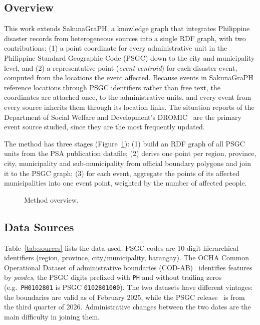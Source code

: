\documentclass[acmtog]{acmart}
\begin{document}

\subsection{Overview}

This work extends SakunaGraPH, a knowledge graph that integrates Philippine disaster records
from heterogeneous sources into a single RDF graph, with two contributions: (1) a point
coordinate for every administrative unit in the Philippine Standard Geographic Code (PSGC)
down to the city and municipality level, and (2) a representative point (\emph{event
centroid}) for each disaster event, computed from the locations the event affected. Because
events in SakunaGraPH reference locations through PSGC identifiers rather than free text, the
coordinates are attached once, to the administrative units, and every event from every source
inherits them through its location links. The situation reports of the Department of Social
Welfare and Development's DROMIC~\cite{dswd2026dromic} are the primary event source studied,
since they are the most frequently updated.

The method has three stages (Figure~\ref{fig:overview}): (1) build an RDF graph of all PSGC
units from the PSA publication datafile; (2) derive one point per region, province, city,
municipality and sub-municipality from official boundary polygons and join it to the PSGC
graph; (3) for each event, aggregate the points of its affected municipalities into one event
point, weighted by the number of affected people.

\begin{figure}[t]
  \centering
  \caption{Method overview.}
  \label{fig:overview}
\end{figure}

\subsection{Data Sources}

Table~\ref{tab:sources} lists the data used. PSGC codes are 10-digit hierarchical identifiers
(region, province, city/municipality, barangay). The OCHA Common Operational Dataset of
administrative boundaries (COD-AB)~\cite{ocha2025codab} identifies features by \emph{pcodes},
the PSGC digits prefixed with \texttt{PH} and without trailing zeros (e.g.\ \texttt{PH0102801}
is PSGC \texttt{0102801000}). The two datasets have different vintages: the boundaries are valid
as of February 2025, while the PSGC release~\cite{psa2026psgc} is from the third quarter of
2026. Administrative changes between the two dates are the main difficulty in joining them.
\end{document}
